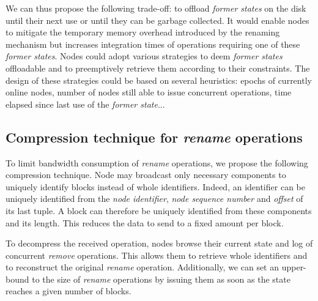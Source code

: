 \documentclass[10pt,journal,compsoc]{IEEEtran}
\begin{document}
We can thus propose the following trade-off: to offload \emph{former states} on the disk until their next use or until they can be garbage collected.
It would enable nodes to mitigate the temporary memory overhead introduced by the renaming mechanism but increases integration times of operations requiring one of these \emph{former states}.
Nodes could adopt various strategies to deem \emph{former states} offloadable and to preemptively retrieve them according to their constraints.
The design of these strategies could be based on several heuristics: epochs of currently online nodes, number of nodes still able to issue concurrent operations, time elapsed since last use of the \emph{former state}...

\subsection{Compression technique for \emph{rename} operations}

\label{sec:compression-rename-op}

To limit bandwidth consumption of \emph{rename} operations, we propose the following compression technique.
Node may broadcast only necessary components to uniquely identify blocks instead of whole identifiers.
Indeed, an identifier can be uniquely identified from the \emph{node identifier}, \emph{node sequence number} and \emph{offset} of its last tuple.
A block can therefore be uniquely identified from these components and its length.
This reduces the data to send to a fixed amount per block.

To decompress the received operation, nodes browse their current state and log of concurrent \emph{remove} operations.
This allows them to retrieve whole identifiers and to reconstruct the original \emph{rename} operation.
Additionally, we can set an upper-bound to the size of \emph{rename} operations by issuing them as soon as the state reaches a given number of blocks.


\end{document}
